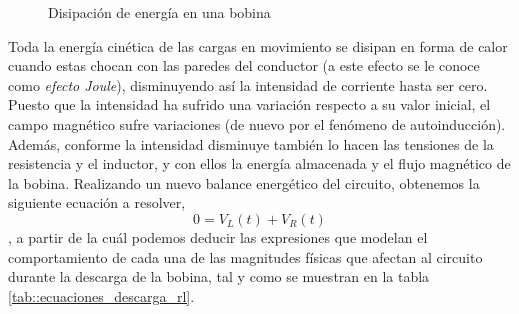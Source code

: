 \documentclass[../main.tex]{subfiles}
\begin{document}
 \begin{figure}[!h]
    \centering
    \caption{Disipación de energía en una bobina}
    \label{fig::carga_bobina}
\end{figure}

Toda la energía cinética de las cargas en movimiento se disipan en forma de calor cuando estas chocan con las paredes del conductor (a este efecto se le conoce como \textit{efecto Joule}), disminuyendo así la intensidad de corriente hasta ser cero. Puesto que la intensidad ha sufrido una variación respecto a su valor inicial, el campo magnético sufre variaciones (de nuevo por el fenómeno de autoinducción). Además, conforme la intensidad disminuye también lo hacen las tensiones de la resistencia y el inductor, y con ellos la energía almacenada y el flujo magnético de la bobina. Realizando un nuevo balance energético del circuito, obtenemos la siguiente ecuación a resolver, 
\begin{equation}
    \label{eqq::descarga_bobina}
    0 = V_L(t) + V_R(t)
\end{equation}
, a partir de la cuál podemos deducir las expresiones que modelan el comportamiento de cada una de las magnitudes físicas que afectan al circuito durante la descarga de la bobina, tal y como se muestran en la tabla \ref{tab::ecuaciones_descarga_rl}.\\
\end{document}
